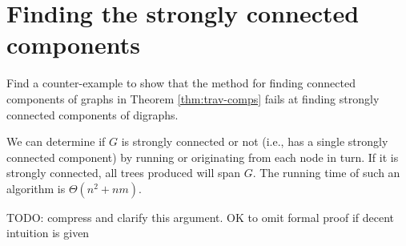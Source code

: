 \section{Finding the strongly connected components}

%


\begin{Boxample}[4]
Find a counter-example to show that the method for finding connected components of graphs 
in Theorem \ref{thm:trav-comps} fails at finding strongly connected components of digraphs.
\end{Boxample}


We can determine if $G$ is strongly connected or not (i.e., has a single strongly connected component) by running  or 
originating from each node in turn. If it is strongly connected, all trees produced will span $G$. 
The running time of such an algorithm is $\Theta(n^2+nm)$.

{\color{red} TODO: compress and clarify this argument. OK to omit formal proof if decent intuition is given}

